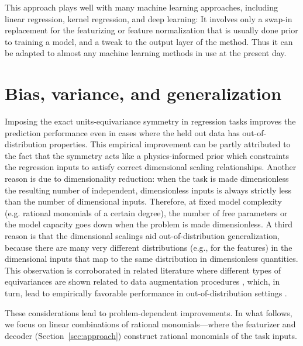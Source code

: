\documentclass[twoside,11pt]{article}
\newcommand{\sectionname}{Section}
\newcommand{\secref}[1]{\sectionname~\ref{#1}}
\begin{document}
This approach plays well with many machine learning approaches, including linear regression, kernel regression, and deep learning:
It involves only a swap-in replacement for the featurizing or feature normalization that is usually done prior to training a model, and a tweak to the output layer of the method.
Thus it can be adapted to almost any machine learning methods in use at the present day.

\section{Bias, variance, and generalization}
\label{sec:bias}

Imposing the exact units-equivariance symmetry in regression tasks improves the prediction performance even in cases where the held out data has out-of-distribution properties.
This empirical improvement can be partly attributed to the fact that the symmetry acts like a physics-informed prior which constraints the regression inputs to satisfy correct dimensional scaling relationships. Another reason is due to dimensionality reduction: when the task is made dimensionless the resulting number of independent, dimensionless inputs is always strictly less than the number of dimensional inputs. Therefore, at fixed model complexity (e.g. rational monomials of a certain degree), the number of free parameters or the model capacity goes down when the problem is made dimensionless. A third reason is that the dimensional scalings aid out-of-distribution generalization, because there are many very different distributions (e.g., for the features) in the dimensional inputs that map to the same distribution in dimensionless quantities. This observation is corroborated in related literature where different types of equivariances are shown related to data augmentation procedures \citep{chen2020group}, which, in turn, lead to empirically favorable performance in out-of-distribution settings \citep{liang2022metashift}.

These considerations lead to problem-dependent improvements. In what follows, we focus on linear combinations of rational monomials---where the featurizer and decoder (\secref{sec:approach}) construct rational monomials of the task inputs. %
\end{document}
